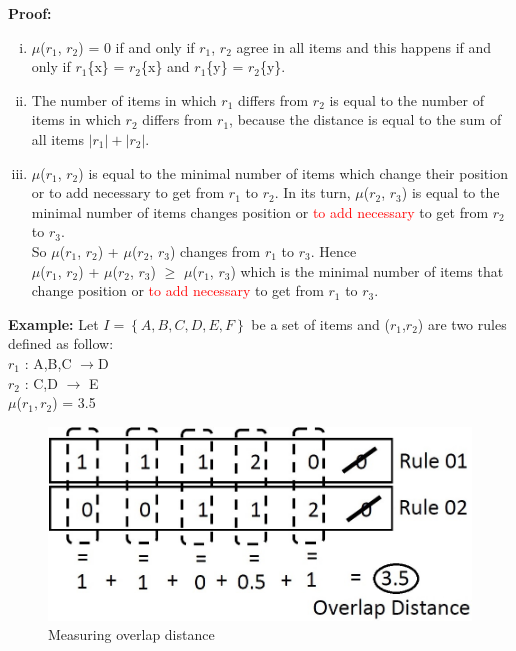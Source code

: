 \documentclass[preprint,12pt]{elsarticle}
\begin{document}
\textbf{Proof:}
\begin{enumerate}[i)]
\item  $\mu$($r_1$, $r_2$) = 0 if and only if $r_1$, $r_2$ agree in all items and this happens if
and only if $r_1$\{x\} = $r_2$\{x\} and $r_1$\{y\} = $r_2$\{y\}.
\item  The number of items in which $r_1$ differs from $r_2$ is equal to the number of
items in which $r_2$ differs from $r_1$, because the distance is equal to the sum of all items $\left|r_1\right|+\left|r_2\right|$.
\item  $\mu$($r_1$, $r_2$) is equal to the minimal number of items which change their position or to add necessary to get
from $r_1$ to $r_2$. In its turn, $\mu$($r_2$, $r_3$) is equal to the minimal number
of items changes position or \textcolor{red}{to add
necessary} to get from $r_2$ to $r_3$.\\
So $\mu$($r_1$, $r_2$) + $\mu$($r_2$, $r_3$) changes from $r_1$ to $r_3$. Hence \\
$\mu$($r_1$, $r_2$) + $\mu$($r_2$, $r_3$) $\geq$ $\mu$($r_1$, $r_3$) which is the minimal number of
items that change position or \textcolor{red}{to add necessary} to get from $r_1$ to $r_3$.
\end{enumerate}
\textbf{Example:}
Let $I=\left\{A,B,C,D,E,F\right\}$ be a set of items and ($r_{1}$,$r_{2}$) are two rules defined as follow:\\
$r_{1}$ : A,B,C $\rightarrow $D\\
$r_{2}$ : C,D $\rightarrow$ E \\
$\mu$($r_{1},r_{2}$) = 3.5
\begin{figure}[h]
\begin{center}
\includegraphics[scale=0.5]{3.jpg}
\end{center}
\label{Fig1}
\caption{Measuring overlap distance}
\end{figure}
\end{document}
